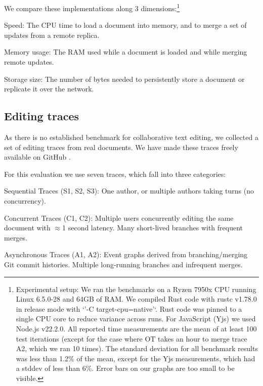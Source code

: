 \documentclass[sigplan,10pt]{acmart}
\begin{document}
We compare these implementations along 3 dimensions:\footnote{Experimental setup: We ran the benchmarks on a Ryzen 7950x CPU running Linux 6.5.0-28 and 64GB of RAM.
We compiled Rust code with rustc v1.78.0 in release mode with `'-C target-cpu=native'`. Rust code was pinned to a single CPU core to reduce variance across runs. %
For JavaScript (Yjs) we used Node.js v22.2.0. %
All reported time measurements are the mean of at least 100 test iterations (except for the case where OT takes an hour to merge trace A2, which we ran 10 times).
The standard deviation for all benchmark results was less than 1.2\% of the mean, except for the Yjs measurements, which had a stddev of less than 6\%. Error bars on our graphs are too small to be visible.}

\begin{description}
\item{Speed:} The CPU time to load a document into memory, and to merge a set of updates from a remote replica.
\item{Memory usage:} The RAM used while a document is loaded and while merging remote updates.
\item{Storage size:} The number of bytes needed to persistently store a document or replicate it over the network.
\end{description}

\subsection{Editing traces}

As there is no established benchmark for collaborative text editing, we collected a set of editing traces from real documents.
We have made these traces freely available on GitHub \cite{editing-traces}.

For this evaluation we use seven traces, which fall into three categories:

\begin{description}
\item{Sequential Traces} (S1, S2, S3): One author, or multiple authors taking turns (no concurrency).
\item{Concurrent Traces} (C1, C2): Multiple users concurrently editing the same document with $\approx$1 second latency. Many short-lived branches with frequent merges.
\item{Asynchronous Traces} (A1, A2): Event graphs derived from branching/merging Git commit histories. Multiple long-running branches and infrequent merges.
\end{description}
\end{document}
